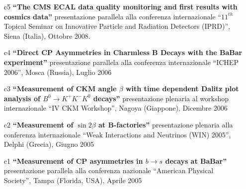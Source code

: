 \documentclass[11pt,twoside,a4paper]{article}
\begin{document}
\begin{enumerate}
\item [c5] \textbf{``The CMS ECAL data quality monitoring and first
  results with cosmics data''} presentazione parallela alla conferenza
  internazionale ``$11^{th}$ Topical Seminar on Innovative Particle
  and Radiation Detectors (IPRD)'', Siena (Italia), Ottobre 2008.
  \vspace{2mm}

\item [c4] \textbf{``Direct CP Asymmetries in Charmless B Decays with the
  BaBar experiment''} presentazione parallela alla conferenza
  internazionale ``ICHEP 2006'', Mosca (Russia), Luglio 2006
  \vspace{2mm}

\item [c3] \textbf{``Measurement of CKM angle $\beta$ with time dependent
  Dalitz plot analysis of $B^0\rightarrow K^+K^-K^0$ decays''}
  presentazione plenaria al workshop internazionale ``IV CKM
  Workshop'', Nagoya (Giappone), Dicembre 2006
  \vspace{2mm}

\item [c2] \textbf{``Measurement of $\sin 2\beta$ at B-factories''}
  presentazione plenaria alla conferenza internazionale ``Weak
  Interactions and Neutrinos (WIN) 2005'', Delphi (Grecia), Giugno
  2005
  \vspace{1mm}

\item [c1] \textbf{``Measurement of CP asymmetries in $b \rightarrow s$
  decays at BaBar''} presentazione parallela alla conferenza
  nazionale ``American Physical Society'', Tampa (Florida, USA),
  Aprile 2005
  \vspace{1mm}

\end{enumerate}

  
\end{document}

